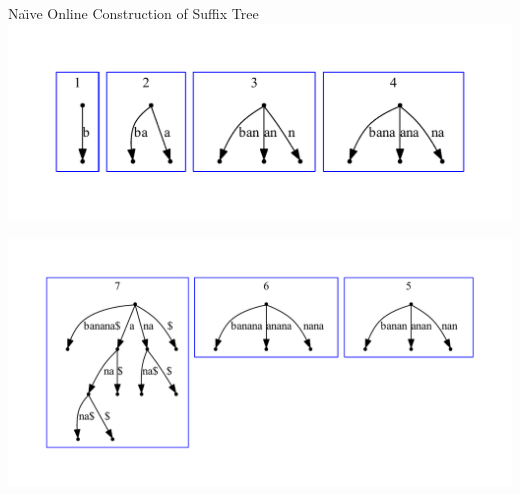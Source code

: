 \begin{frame}{Na\"{\i}ve Online Construction of Suffix Tree}
\includegraphics[height=0.35\textheight,trim=40pt 40pt 40pt 40pt]{naive-banana_0-3.pdf}

\includegraphics[height=0.51\textheight,trim=40pt 40pt 40pt 40pt]{naive-banana_4-6.pdf}
\end{frame}

